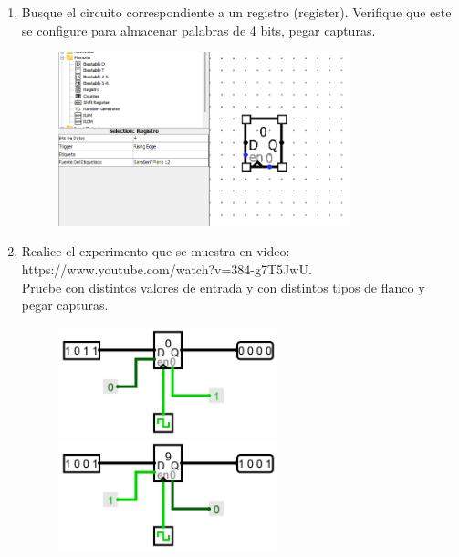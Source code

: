 \documentclass{templateNote}
\begin{document}
\begin{enumerate}
    \item Busque el circuito correspondiente a un registro (register). Verifique que este se configure para almacenar palabras de 4 bits, pegar capturas.
    
    \begin{figure}[H]
        \centering  
        \includegraphics[width=0.8\textwidth]{img/regisstro.png}
    \end{figure}

    \item Realice el experimento que se muestra en video: \\https://www.youtube.com/watch?v=384-g7T5JwU. \\Pruebe con distintos valores de entrada y con distintos tipos de flanco y pegar capturas.
    
    \begin{figure}[H]
        \centering
        \includegraphics[width=0.6\textwidth]{img/primertry.png}
        \includegraphics[width=0.6\textwidth]{img/segundotry.png}
    \end{figure}


\end{enumerate}
\end{document}
